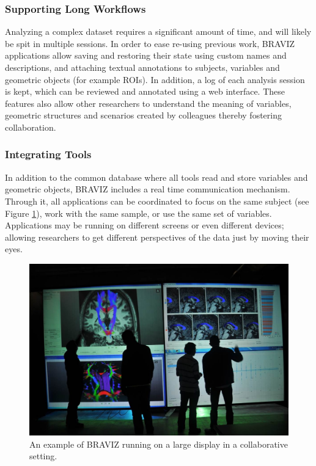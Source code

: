 \documentclass[twocolumn]{svjour3}
\begin{document}
\subsubsection{Supporting Long Workflows}

Analyzing a complex dataset requires a significant amount of time, and will likely be spit in multiple sessions. In order to ease re-using previous work, BRAVIZ applications allow saving and restoring their state using custom names and descriptions, and attaching textual annotations to subjects, variables and geometric objects (for example ROIs). In addition, a log of each analysis session is kept, which can be reviewed and annotated using a web interface. These features also allow other researchers to understand the meaning of variables, geometric structures and scenarios created by colleagues thereby fostering collaboration. 

\subsubsection{Integrating Tools}

In addition to the common database where all tools read and store variables and geometric objects, BRAVIZ includes a real time communication mechanism. Through it, all applications can be coordinated to focus on the same subject (see Figure \ref{fig_imagine}), work with the same sample, or use the same set of variables. Applications may be running on different screens or even different devices; allowing researchers to get different perspectives of the data just by moving their eyes. 


\begin{figure}
\begin{center}
\includegraphics[width=\linewidth]{imagine.jpg}
\end{center}
 \caption{\label{fig_imagine} An example of BRAVIZ running on a large display in a collaborative setting.}
\end{figure}
\end{document}
